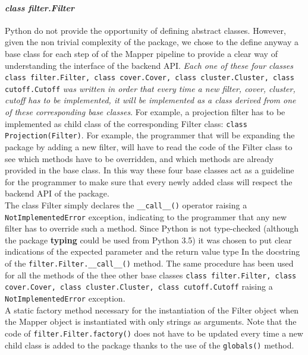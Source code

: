 \paragraph{\textit{class filter.Filter}} \label{subsubsection:class filter.Filter}
Python do not provide the opportunity of defining abstract classes. However, given the non trivial complexity of the package, we chose to the define anyway a base class for each step of of the Mapper pipeline to provide a clear way of understanding the interface of the backend API. \textit{Each one of these four classes} \lstinline{class filter.Filter, class cover.Cover, class cluster.Cluster, class cutoff.Cutoff} \textit{was written in order that every time a new filter, cover, cluster, cutoff has to be implemented, it will be implemented as a class derived from one of these corresponding base classes}. For example, a projection filter has to be implemented as child class of the corresponding Filter class: \lstinline|class Projection(Filter)|. For example, the programmer that will be expanding the package by adding a new filter, will have to read the code of the Filter class to see which methods have to be overridden, and which methods are already provided in the base class. In this way these four base classes act as a guideline for the programmer to make sure that every newly added class will respect the backend API of the package.\\The class Filter simply declares the \lstinline{__call__()} operator raising a \lstinline{NotImplementedError} exception, indicating to the programmer that any new filter has to override such a method. Since Python is not type-checked (although the package \textbf{typing} could be used from Python 3.5) it was chosen to put clear indications of the expected parameter and the return value type In the docstring of the \lstinline{filter.Filter.__call__()} method. The same procedure has been used for all the methods of the thee other base classes \lstinline{class filter.Filter, class cover.Cover, class cluster.Cluster, class cutoff.Cutoff} raising a \lstinline{NotImplementedError} exception.\\ A static factory method necessary for the instantiation of the Filter object when the Mapper object is instantiated with only strings as arguments. Note that the code of \lstinline{filter.Filter.factory()} does not have to be updated every time a new child class is added to the package thanks to the use of the \lstinline{globals()} method.
